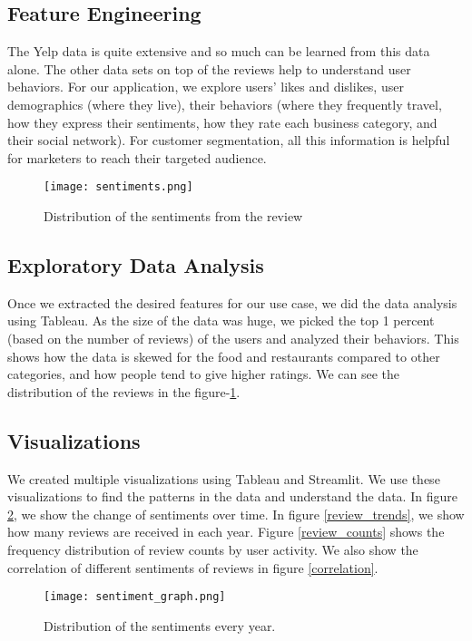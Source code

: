 \documentclass[conference]{IEEEtran}
\begin{document}
\subsection{Feature Engineering}
The Yelp data is quite extensive and so much can be learned from this data alone. The other data sets on top of the reviews help to understand user behaviors. For our application, we explore users' likes and dislikes, user demographics (where they live), their behaviors (where they frequently travel, how they express their sentiments, how they rate each business category, and their social network). For customer segmentation, all this information is helpful for marketers to reach their targeted audience. 
\begin{figure}[H]
    \label{fig:sentiment}
    \centering
    \texttt{[image: sentiments.png]}
    \caption{Distribution of the sentiments from the review}
\end{figure}

\subsection{Exploratory Data Analysis}
Once we extracted the desired features for our use case, we did the data analysis using Tableau. As the size of the data was huge, we picked the top 1 percent (based on the number of reviews) of the users and analyzed their behaviors. This shows how the data is skewed for the food and restaurants compared to other categories, and how people tend to give higher ratings. We can see the distribution of the reviews in the figure-\ref{fig:sentiment}. 


\subsection{Visualizations}
We created multiple visualizations using Tableau and Streamlit. We use these visualizations to find the patterns in the data and understand the data. In figure \ref{sentiment_graph}, we show the change of sentiments over time. In figure \ref{review_trends}, we show how many reviews are received in each year. Figure \ref{review_counts} shows the frequency distribution of review counts by user activity. We also show the correlation of different sentiments of reviews in figure \ref{correlation}.


\begin{figure}[h]
    \label{sentiment_graph}
    \centering
    \texttt{[image: sentiment\_graph.png]}
    \caption{Distribution of the sentiments every year.}
\end{figure}
\end{document}
